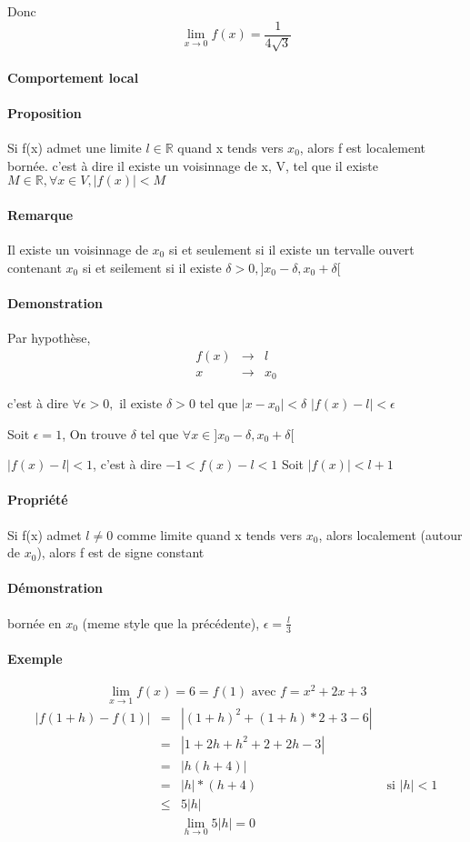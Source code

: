Donc \[\lim_{x \to 0} f(x) = \frac{1}{4\sqrt{3}}\]

\paragraph{Comportement local}
\paragraph{Proposition} Si f(x) admet une limite $l \in \mathbb{R}$ quand x tends vers $x_0$, alors f est localement bornée.
c'est à dire il existe un voisinnage de x, V, tel que il existe $M \in \mathbb{R}, \forall x \in V, |f(x)| < M$
\paragraph{Remarque} Il existe un voisinnage de $x_0$ si et seulement si il existe un tervalle ouvert contenant $x_0$ si et seilement si il existe $\delta > 0, ]x_0 - \delta, x_0 + \delta[$

\paragraph{Demonstration}
	Par hypothèse, 
\begin{align*}
	f(x) &\rightarrow & l\\
	  x & \rightarrow & x_0
\end{align*}

c'est à dire $\forall \epsilon > 0, \text{ il existe } \delta > 0 \text{ tel que } |x-x_0| < \delta$   $|f(x)-l| < \epsilon$

Soit $\epsilon = 1$, On trouve $\delta$ tel que $\forall x \in ]x_0 - \delta, x_0 + \delta[ $

	$|f(x) - l| < 1$, c'est à dire $-1 < f(x) - l < 1$ Soit $|f(x)| < l+1$ 

\paragraph{Propriété}Si f(x) admet $l \neq 0$ comme limite quand x tends vers $x_0$, alors localement (autour de $x_0$), alors f est de signe constant
\paragraph{Démonstration} bornée en $x_0$ (meme style que la précédente), $\epsilon = \frac{l}{3}$

\paragraph{Exemple} \[\lim_{x \to 1} f(x) = 6 = f(1) \text{ avec } f=x^2+2x+3\]
\begin{align*}
	|f(1+h) - f(1)| &=& |(1+h)^2 + (1+h)*2 + 3 - 6| \\
	&=& |1+2h+h^2 + 2 + 2h -3| \\
	&=& |h(h+4)| \\
	&=& |h|*(h+4)  & \text{      si } |h| < 1 \\
	&\leq& 5|h|\\
	&& \lim_{h \to 0} 5|h| = 0
\end{align*}


